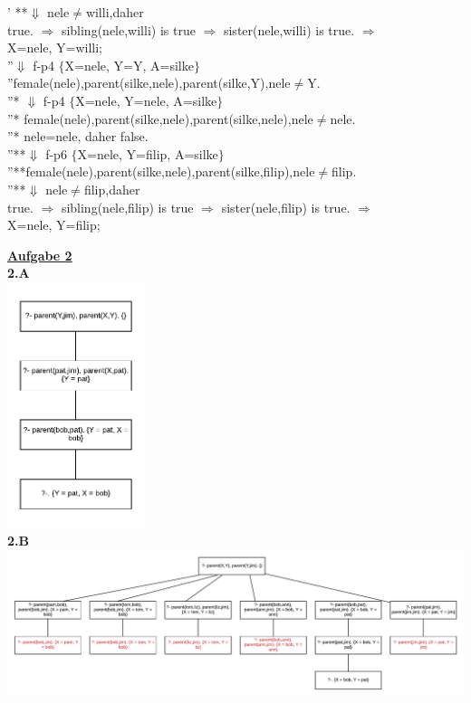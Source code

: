 \documentclass[a4paper, dvipsnames]{article}
\begin{document}
{{\begin{flushleft}
' **$\Downarrow$ nele$\neq$willi,daher \\
true. $\Rightarrow$ sibling(nele,willi)  is true $\Rightarrow$ sister(nele,willi) is true. $\Rightarrow$\\
X=nele, Y=willi;\\
''$\Downarrow$ f-p4 $\lbrace$X=nele, Y=Y, A=silke$\rbrace$\\
''female(nele),parent(silke,nele),parent(silke,Y),nele$\neq$Y. \\
''* $\Downarrow$ f-p4 $\lbrace$X=nele, Y=nele, A=silke$\rbrace$\\
''* female(nele),parent(silke,nele),parent(silke,nele),nele$\neq$nele. \\
''* nele=nele, daher false.\\
''**$\Downarrow$ f-p6 $\lbrace$X=nele, Y=filip, A=silke$\rbrace$\\
''**female(nele),parent(silke,nele),parent(silke,filip),nele$\neq$filip. \\
''**$\Downarrow$ nele$\neq$filip,daher \\
true. $\Rightarrow$ sibling(nele,filip)  is true $\Rightarrow$ sister(nele,filip) is true. $\Rightarrow$\\
X=nele, Y=filip;
\end{flushleft}
 }


\uline{\bfseries{Aufgabe 2}}\\

{\bfseries 2.A}\\
\includegraphics[width=0.3\textwidth]{Data/A2/a.pdf} \\

{\bfseries 2.B}\\
\includegraphics[width=1.0\textwidth]{Data/A2/b.pdf} \\

}
\end{document}

